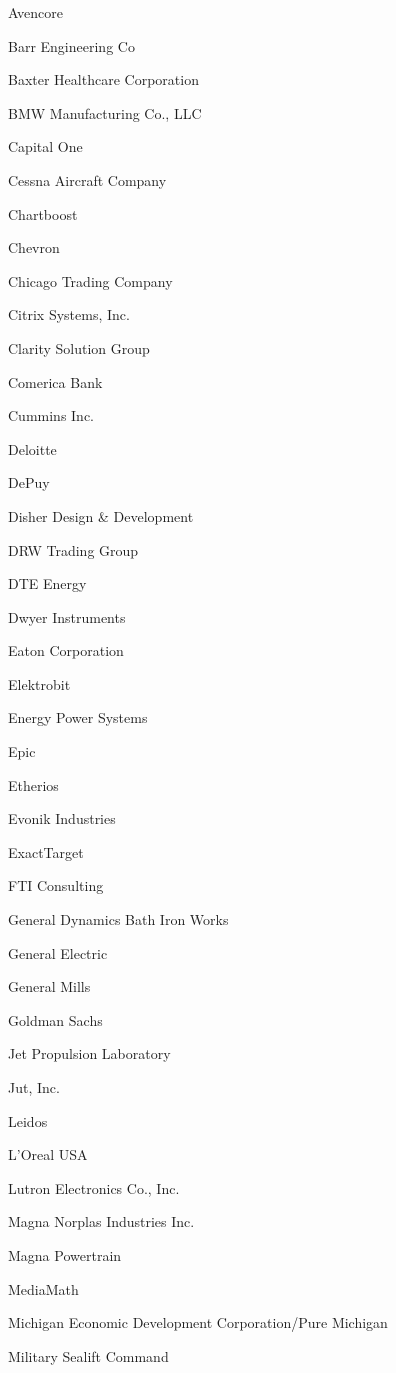 \documentclass[twoside]{article}
\begin{document}
\begin{center}
\begin{multicols}{5}
\begin{FlushLeft}
\begin{compactitem}
\item Avencore
\item Barr Engineering Co
\item Baxter Healthcare Corporation
\item BMW Manufacturing Co., LLC
\item Capital One
\item Cessna Aircraft Company
\item Chartboost
\item Chevron
\item Chicago Trading Company
\item Citrix Systems, Inc.
\item Clarity Solution Group
\item Comerica Bank
\item Cummins Inc.
\item Deloitte
\item DePuy
\item Disher Design \& Development
\item DRW Trading Group
\item DTE Energy
\item Dwyer Instruments
\item Eaton Corporation
\item Elektrobit
\item Energy Power Systems
\item Epic
\item Etherios
\item Evonik Industries
\item ExactTarget
\item FTI Consulting
\item General Dynamics Bath Iron Works
\item General Electric
\item General Mills
\item Goldman Sachs
\item Jet Propulsion Laboratory
\item Jut, Inc.
\item Leidos
\item L'Oreal USA
\item Lutron Electronics Co., Inc.
\item Magna Norplas Industries Inc.
\item Magna Powertrain
\item MediaMath
\item Michigan Economic Development Corporation/Pure Michigan
\item Military Sealift Command

\end{compactitem}
\end{FlushLeft}
\end{multicols}
\end{center}
\end{document}

